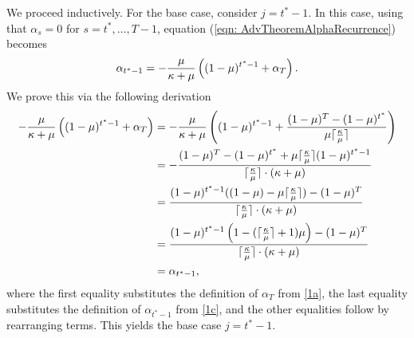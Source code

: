 We proceed inductively. For the base case, consider $j = t^*-1$. In this case, using that $\alpha_{s} = 0$ for $s=t^*, \ldots, T-1$, equation (\ref{eqn: AdvTheoremAlphaRecurrence}) becomes
    \begin{equation*}
        \alpha_{t^*-1} = -\frac{\mu}{\kappa +\mu} \left( (1-\mu)^{t^*-1} + \alpha_T \right).
    \end{equation*}
    We prove this via the following derivation
    \begin{align*}
        -\frac{\mu}{\kappa +\mu} \left( (1-\mu)^{t^*-1} + \alpha_T \right) &= -\frac{\mu}{\kappa +\mu} \left( (1-\mu)^{t^*-1} + \frac{ (1-\mu)^T - (1-\mu)^{t^*} }{\mu \lceil \frac{\kappa}{\mu}\rceil}\right)\\
        &= - \frac{ (1-\mu)^T - (1-\mu)^{t^*} + \mu \lceil \frac{\kappa}{\mu} \rceil  (1-\mu)^{t^*-1} }{\lceil \frac{\kappa}{\mu} \rceil \cdot (\kappa+\mu)}\\
        &= \frac{ (1-\mu)^{t^*-1}( (1-\mu) - \mu \lceil\frac{\kappa}{\mu} \rceil) - (1-\mu)^T}{\lceil \frac{\kappa}{\mu} \rceil \cdot (\kappa+\mu)}\\
        &= \frac{(1-\mu)^{t^*-1} \left(1 - (\lceil \frac{\kappa}{\mu}\rceil+1)\mu \right) - (1-\mu)^T}{\lceil \frac{\kappa}{\mu} \rceil \cdot (\kappa+\mu)}\\
        &= \alpha_{t^*-1},
    \end{align*}
    where the first equality substitutes the definition of $\alpha_T$ from \eqref{1a}, the last equality substitutes the definition of $\alpha_{t^*-1}$ from \eqref{1c}, and the other equalities follow by rearranging terms.  This yields the base case $j = t^*-1$.

